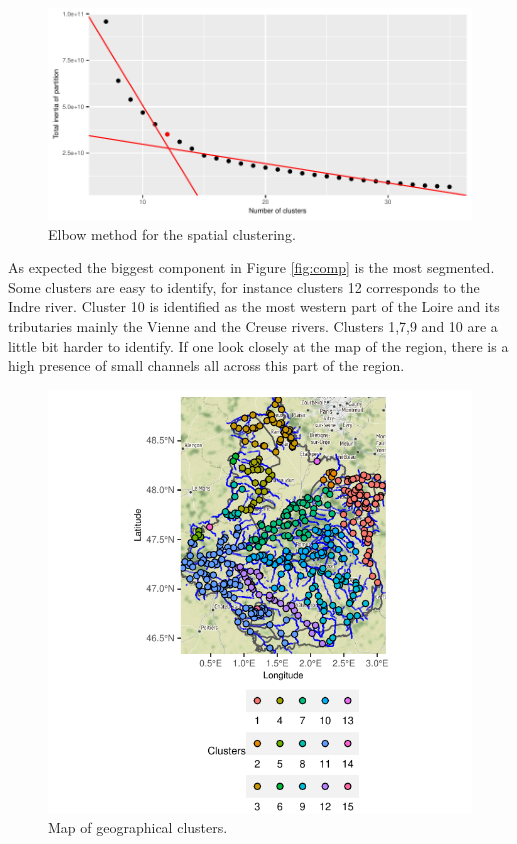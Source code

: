 \begin{figure}[htbp]
  \centering
  \includegraphics[]{figs/Chap5/Elb_clust.pdf}
  \caption{Elbow method for the spatial clustering.}
  \label{fig:elb:clust}
\end{figure}

As expected the biggest component in Figure \ref{fig:comp} is the most segmented. Some clusters are easy to identify, for instance clusters 12 corresponds to the Indre river. Cluster 10 is identified as the most western part of the Loire and its tributaries mainly the Vienne and the Creuse rivers. Clusters 1,7,9 and 10 are a little bit harder to identify. If one look closely at the map of the region, there is a high presence of small channels all across this part of the region. 

\begin{figure}[htbp]
  \centering
  \includegraphics[]{figs/Chap5/Graph_clust.pdf}
  \caption{Map of geographical clusters.}
  \label{fig:clust}
\end{figure}

